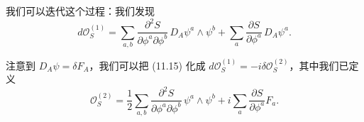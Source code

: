 我们可以迭代这个过程：我们发现
\begin{equation}
  \tag{11.15}
  \label{eq:11-15}
  d\mathcal{O}_{S}^{(1)}=\sum_{a,b}\frac{\partial^{2}S}{\partial\phi^{a}\partial\phi^{b}}
  \,D_{A}\psi^{a}\wedge\psi^{b}+\sum_{a}\frac{\partial S}{\partial\phi^{a}}\,D_{A}\psi^{a}.
\end{equation}

注意到 $D_{A}\psi=\delta F_{A}$，我们可以把 (11.15) 化成 $d\mathcal{O}_{S}^{(1)}=-i\delta\mathcal{O}_{S}^{(2)}$，其中我们已定义
\begin{equation}
  \tag{11.16}
  \label{eq:11-16}
  \mathcal{O}_{S}^{(2)}=\frac{1}{2}\sum_{a,b}\frac{\partial^{2}S}{\partial\phi^{a}\partial\phi^{b}}
  \,\psi^{a}\wedge\psi^{b}+i\sum_{a}\frac{\partial S}{\partial\phi^{a}}F_{a}.
\end{equation}



